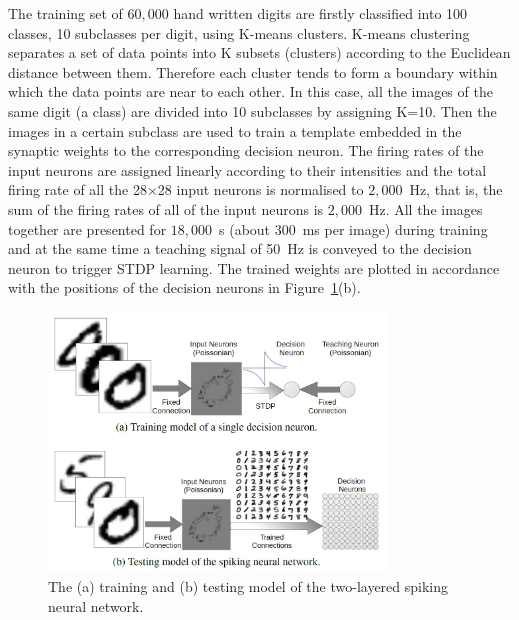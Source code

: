 The training set of $60,000$ hand written digits are firstly classified into 100 classes, 10 subclasses per digit, using K-means clusters.
K-means clustering separates a set of data points into K subsets (clusters) according to the Euclidean distance between them.
Therefore each cluster tends to form a boundary within which the data points are near to each other.
In this case, all the images of the same digit (a class) are divided into 10 subclasses by assigning K=10.
Then the images in a certain subclass are used to train a template embedded in the synaptic weights to the corresponding decision neuron.
The firing rates of the input neurons are assigned linearly according to their intensities and the total firing rate of all the 28$\times$28 input neurons is normalised to $2,000$~Hz, that is, the sum of the firing rates of all of the input neurons is $2,000$~Hz.
All the images together are presented for $18,000$~s (about 300~ms per image) during training and at the same time a teaching signal of 50~Hz is conveyed to the decision neuron to trigger STDP learning.
The trained weights are plotted in accordance with the positions of the decision neurons in Figure~\ref{fig:model}(b).

\begin{figure}[thb!]
	\centering
	\includegraphics[width=0.8\textwidth]{pics_bench/fig6}
	\caption{The (a) training and (b) testing model of the two-layered spiking neural network.}
	\label{fig:model}
\end{figure} 



